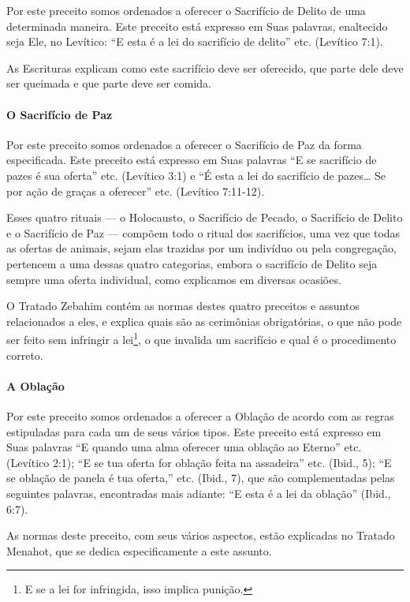 Por este preceito somos ordenados a oferecer o Sacrifício de Delito de
uma determinada maneira. Este preceito está expresso em Suas palavras,
enaltecido seja Ele, no Levítico: ``E esta é a lei do sacrifício de
delito'' etc. (Levítico 7:1).

As Escrituras explicam como este sacrifício deve ser oferecido, que
parte dele deve ser queimada e que parte deve ser comida.

\paragraph{O Sacrifício de Paz}

Por este preceito somos ordenados a oferecer o Sacrifício de Paz da
forma especificada. Este preceito está expresso em Suas palavras ``E se
sacrifício de pazes é sua oferta'' etc. (Levítico 3:1) e ``É esta a lei
do sacrifício de pazes\ldots{} Se por ação de graças a oferecer'' etc.
(Levítico 7:11-12).

Esses quatro rituais --- o Holocausto, o Sacrifício de Pecado, o
Sacrifício de Delito e o Sacrifício de Paz --- compõem todo o ritual
dos sacrifícios, uma vez que todas as ofertas de animais, sejam elas
trazidas por um indivíduo ou pela congregação, pertencem a uma dessas
quatro categorias, embora o sacrifício de Delito seja sempre uma oferta
individual, como explicamos em diversas ocasiões.

O Tratado Zebahim contém as normas destes quatro preceitos e assuntos
relacionados a eles, e explica quais são as cerimônias obrigatórias, o
que não pode ser feito sem infringir a lei\footnote{E se a lei for infringida, isso implica punição.}, o que
invalida um sacrifício e qual é o procedimento correto.

\paragraph{A Oblação}

Por este preceito somos ordenados a oferecer a Oblação de acordo com as
regras estipuladas para cada um de seus vários tipos. Este preceito está
expresso em Suas palavras ``E quando uma alma oferecer uma oblação ao
Eterno'' etc. (Levítico 2:1); ``E se tua oferta for oblação feita na
assadeira'' etc. (Ibid., 5); ``E se oblação de panela é tua oferta,''
etc. (Ibid., 7), que são complementadas pelas seguintes palavras,
encontradas mais adiante: ``E esta é a lei da oblação'' (Ibid., 6:7).

As normas deste preceito, com seus vários aspectos, estão explicadas no
Tratado Menahot, que se dedica especificamente a este assunto.

